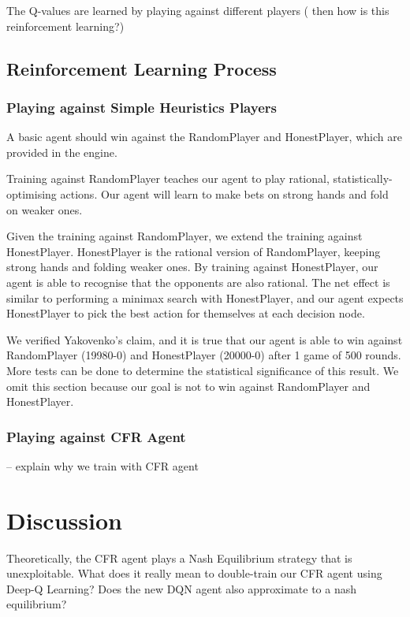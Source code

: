\documentclass{article}
\begin{document}
The Q-values are learned by playing against different players ( then how is this reinforcement learning?)

\subsection{Reinforcement Learning Process}

\subsubsection{Playing against Simple Heuristics Players}
A basic agent should win against the RandomPlayer and HonestPlayer, which are provided in the engine.

Training against RandomPlayer teaches our agent to play rational, statistically-optimising actions. Our agent will learn to make bets on strong hands and fold on weaker ones. 

Given the training against RandomPlayer, we extend the training against HonestPlayer. HonestPlayer is the rational version of RandomPlayer, keeping strong hands and folding weaker ones. By training against HonestPlayer, our agent is able to recognise that the opponents are also rational. The net effect is similar to performing a minimax search with HonestPlayer, and our agent expects HonestPlayer to pick the best action for themselves at each decision node.

We verified Yakovenko's claim, and it is true that our agent is able to win against RandomPlayer (19980-0) and HonestPlayer (20000-0) after 1 game of 500 rounds. More tests can be done to determine the statistical significance of this result. We omit this section because our goal is not to win against RandomPlayer and HonestPlayer.

\subsubsection{Playing against CFR Agent}

-- explain why we train with CFR agent

\section{Discussion}
Theoretically, the CFR agent plays a Nash Equilibrium strategy that is unexploitable. What does it really mean to double-train our CFR agent using Deep-Q Learning?
 Does the new DQN agent also approximate to a nash equilibrium?
\end{document}
